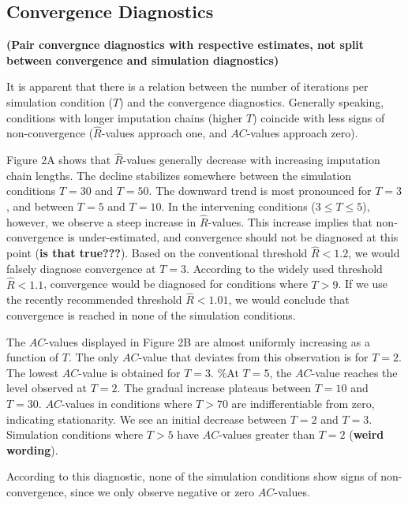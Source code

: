\documentclass[Royal,times,sageh]{sagej}
\begin{document}
\hypertarget{convergence-diagnostics-1}{%
\subsection{Convergence Diagnostics}\label{convergence-diagnostics-1}}

\textbf{(Pair convergnce diagnostics with respective estimates, not
split between convergence and simulation diagnostics)}

It is apparent that there is a relation between the number of iterations
per simulation condition (\(T\)) and the convergence diagnostics.
Generally speaking, conditions with longer imputation chains (higher
\(T\)) coincide with less signs of non-convergence
(\(\widehat{R}\)-values approach one, and \(AC\)-values approach zero).

Figure 2A shows that \(\widehat{R}\)-values generally decrease with
increasing imputation chain lengths. The decline stabilizes somewhere
between the simulation conditions \(T=30\) and \(T=50\). The downward
trend is most pronounced for \(T=3\), and between \(T = 5\) and
\(T = 10\). In the intervening conditions (\(3 \leq T \leq 5\)),
however, we observe a steep increase in \(\widehat{R}\)-values. This
increase implies that non-convergence is under-estimated, and
convergence should not be diagnosed at this point (\textbf{is that
true???}). Based on the conventional threshold \(\widehat{R} < 1.2\), we
would falsely diagnose convergence at \(T=3\). According to the widely
used threshold \(\widehat{R} < 1.1\), convergence would be diagnosed for
conditions where \(T>9\). If we use the recently recommended threshold
\(\widehat{R} < 1.01\), we would conclude that convergence is reached in
none of the simulation conditions.

The \(AC\)-values displayed in Figure 2B are almost uniformly increasing
as a function of \(T\). The only \(AC\)-value that deviates from this
observation is for \(T=2\). The lowest \(AC\)-value is obtained for
\(T=3\). \%At \(T=5\), the \(AC\)-value reaches the level observed at
\(T=2\). The gradual increase plateaus between \(T=10\) and \(T=30\).
\(AC\)-values in conditions where \(T>70\) are indifferentiable from
zero, indicating stationarity. We see an initial decrease between
\(T=2\) and \(T=3\). Simulation conditions where \(T>5\) have
\(AC\)-values greater than \(T=2\) (\textbf{weird wording}).

According to this diagnostic, none of the simulation conditions show
signs of non-convergence, since we only observe negative or zero
\(AC\)-values.
\end{document}
